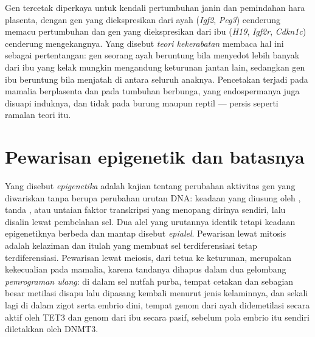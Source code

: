 \begin{remark}\label{rem:b3:chromatin-epigenetics:kinship}
Gen tercetak diperkaya untuk kendali pertumbuhan janin dan pemindahan hara
plasenta, dengan gen yang diekspresikan dari ayah (\emph{Igf2}, \emph{Peg3})
cenderung memacu pertumbuhan dan gen yang diekspresikan dari ibu
(\emph{H19}, \emph{Igf2r}, \emph{Cdkn1c}) cenderung mengekangnya. Yang
disebut \emph{teori kekerabatan} membaca hal ini sebagai pertentangan: gen
seorang ayah beruntung bila menyedot lebih banyak dari ibu yang kelak mungkin
mengandung keturunan jantan lain, sedangkan gen ibu beruntung bila menjatah
di antara seluruh anaknya. Pencetakan terjadi pada mamalia berplasenta dan
pada tumbuhan berbunga, yang endospermanya juga disuapi induknya, dan tidak
pada burung maupun reptil --- persis seperti ramalan teori itu.
\end{remark}

\section{Pewarisan epigenetik dan batasnya}

\begin{definition}[Epigenetika]\label{def:b3:chromatin-epigenetics:epigenetics}
Yang disebut \emph{epigenetika} adalah kajian tentang perubahan aktivitas gen
yang diwariskan tanpa berupa perubahan urutan DNA: keadaan yang diusung oleh
, tanda , atau untaian faktor transkripsi yang menopang
dirinya sendiri, lalu disalin lewat pembelahan sel. Dua alel yang urutannya
identik tetapi keadaan epigenetiknya berbeda dan mantap disebut
\emph{epialel}. Pewarisan lewat mitosis adalah kelaziman dan itulah yang
membuat sel terdiferensiasi tetap terdiferensiasi. Pewarisan lewat meiosis,
dari tetua ke keturunan, merupakan kekecualian pada mamalia, karena tandanya
dihapus dalam dua gelombang \emph{pemrograman ulang}: di dalam sel nutfah
purba, tempat cetakan dan sebagian besar metilasi disapu lalu dipasang
kembali menurut jenis kelaminnya, dan sekali lagi di dalam zigot serta embrio
dini, tempat genom dari ayah didemetilasi secara aktif oleh TET3 dan genom
dari ibu secara pasif, sebelum pola embrio itu sendiri diletakkan oleh DNMT3.
\end{definition}

